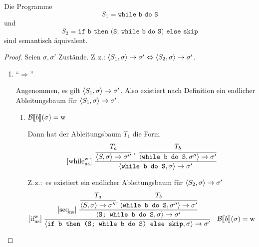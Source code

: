 \begin{example}
    Die Programme
    \[
    S_1 = \texttt{while b do S}
    \]
    und
    \[
    S_2 = \texttt{if b then (S; while b do S) else skip}
    \]
    sind semantisch äquivalent.
\end{example}
\begin{proof}
    Seien $\sigma, \sigma'$ Zustände. Z.\,z.: $\strans{S_1}{\sigma}{\sigma'} \Leftrightarrow \strans{S_2}{\sigma}{\sigma'}$.

    \begin{enumerate}
        \item ``$\Rightarrow$''

            Angenommen, es gilt $\strans{S_1}{\sigma}{\sigma'}$. Also existiert nach Definition ein endlicher Ableitungsbaum für $\strans{S_1}{\sigma}{\sigma'}$.
            \begin{enumerate}
                \item $\Bsem{b}(\sigma) = \true$

                    Dann hat der Ableitungsbaum $T_1$ die Form
                    \begin{align*}
                        \infruleNs[\true]{while}\;
                        \cfrac{
                            \cfrac{T_a}{\strans{S}{\sigma}{\sigma''}}
                            \;,\;
                            \cfrac{T_b}{\strans{\texttt{while b do S}}{\sigma''}{\sigma'}}
                        }{
                            \strans{\texttt{while b do S}}{\sigma}{\sigma'}
                        }
                    \end{align*}

                    Z.\,z.:\ es existiert ein endlicher Ableitungsbaum für $\strans{S_2}{\sigma}{\sigma'}$
                    \begin{align*}
                        \infruleNs[\true]{if}\;
                        \cfrac{
                            \infruleNs{seq}\;
                            \cfrac{
                                \cfrac{T_a}{\strans{S}{\sigma}{\sigma''}}
                                ,
                                \cfrac{T_b}{\strans{\texttt{while b do S}}{\sigma''}{\sigma'}}
                            }{
                                \strans{\texttt{S; while b do S}}{\sigma}{\sigma'}
                            }
                        }{
                            \strans{\texttt{if b then (S; while b do S) else skip}}{\sigma}{\sigma'}
                        }
                        \quad
                        \Bsem{b}(\sigma) = \true
                    \end{align*}


\end{enumerate}
\end{enumerate}
\end{proof}
